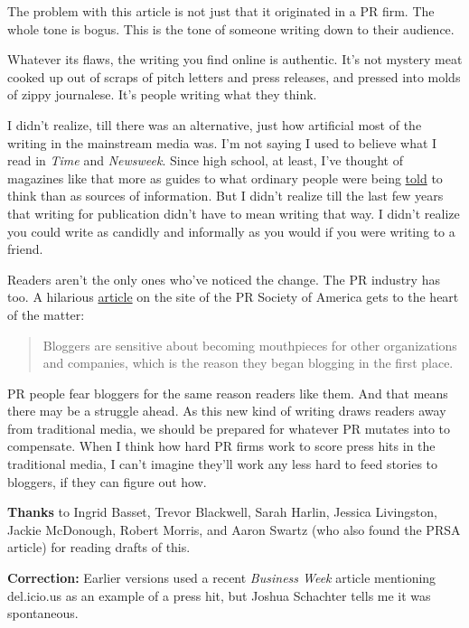 The problem with this article is not just that it originated in a PR
firm. The whole tone is bogus. This is the tone of someone writing down
to their audience.

Whatever its flaws, the writing you find online is authentic. It's not
mystery meat cooked up out of scraps of pitch letters and press
releases, and pressed into molds of zippy journalese. It's people
writing what they think.

I didn't realize, till there was an alternative, just how artificial
most of the writing in the mainstream media was. I'm not saying I used
to believe what I read in \emph{Time} and \emph{Newsweek}. Since high
school, at least, I've thought of magazines like that more as guides to
what ordinary people were being \href{say.html}{told} to think than as
sources of information. But I didn't realize till the last few years
that writing for publication didn't have to mean writing that way. I
didn't realize you could write as candidly and informally as you would
if you were writing to a friend.

Readers aren't the only ones who've noticed the change. The PR industry
has too. A hilarious
\href{http://www.prsa.org/_Publications/magazines/0802news1.asp}{article}
on the site of the PR Society of America gets to the heart of the
matter:

\begin{quote}
Bloggers are sensitive about becoming mouthpieces for other
organizations and companies, which is the reason they began blogging in
the first place.
\end{quote}

PR people fear bloggers for the same reason readers like them. And that
means there may be a struggle ahead. As this new kind of writing draws
readers away from traditional media, we should be prepared for whatever
PR mutates into to compensate. When I think how hard PR firms work to
score press hits in the traditional media, I can't imagine they'll work
any less hard to feed stories to bloggers, if they can figure out how.


\textbf{Thanks} to Ingrid Basset, Trevor Blackwell, Sarah Harlin,
Jessica Livingston, Jackie McDonough, Robert Morris, and Aaron Swartz
(who also found the PRSA article) for reading drafts of this.

\textbf{Correction:} Earlier versions used a recent \emph{Business Week}
article mentioning del.icio.us as an example of a press hit, but Joshua
Schachter tells me it was spontaneous.